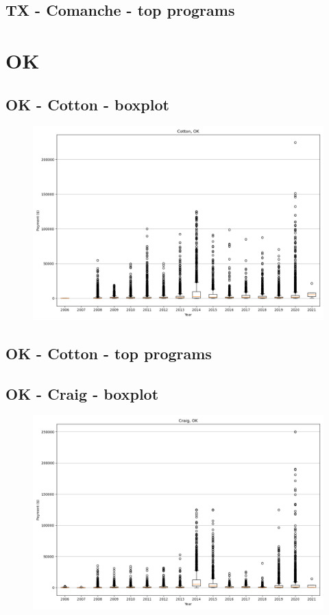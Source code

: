 \subsection*{TX - Comanche - top programs}

\newpage
\section*{OK}
\subsection*{OK - Cotton - boxplot}
\begin{figure}[h]
\centering
\includegraphics[width=7in]{../output/boxplots/counties/Cotton-OK_boxplot.png}
\end{figure}


\subsection*{OK - Cotton - top programs}

\newpage
\subsection*{OK - Craig - boxplot}
\begin{figure}[h]
\centering
\includegraphics[width=7in]{../output/boxplots/counties/Craig-OK_boxplot.png}
\end{figure}


